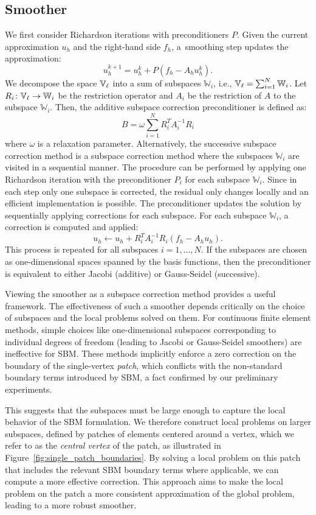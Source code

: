 \documentclass{elsarticle}
\begin{document}
\subsection{Smoother}
\label{sec:smoother}
We first consider Richardson iterations with preconditioners $P$. Given the current
approximation $u_h$ and the right-hand side $f_h$, a~smoothing step updates
the approximation:
\[
    u_h^{k+1} = u_h^k + P(f_h - A_h u_h^k).
\]
We decompose the space ${\mathbb{V}_\ell}$ into a sum of subspaces $\mathbb{W}_i$, i.e., ${\mathbb{V}_\ell} = \sum_{i=1}^N \mathbb{W}_i$. Let
$R_i\colon {\mathbb{V}_\ell} \to \mathbb{W}_i$ be the restriction operator and $A_i$ be the restriction of $A$ to the subspace
$\mathbb{W}_i$. Then, the additive subspace correction preconditioner is defined as:
\[
    B = \omega \sum_{i=1}^N R_i^T A_i^{-1} R_i
\]
where $\omega$ is a relaxation parameter. Alternatively, the successive subspace correction method is a subspace
correction method where the subspaces $\mathbb{W}_i$ are visited in a sequential manner. The procedure can be performed
by applying one Richardson iteration with the preconditioner $P_i$ for each subspace $\mathbb{W}_i$. Since in each step
only one subspace is corrected, the residual only changes locally and an efficient implementation is possible. The
preconditioner updates the solution by sequentially applying corrections for each subspace. For each subspace
$\mathbb{W}_i$, a correction is computed and applied:
\[
    u_h \leftarrow u_h + R_i^T A_i^{-1} R_i (f_h - A_h u_h).
\]
This process is repeated for all subspaces $i=1, \ldots, N$. If the subspaces are chosen as one-dimensional spaces
spanned by the basis functions, then the preconditioner is equivalent to either Jacobi (additive) or Gauss-Seidel
(successive).

Viewing the smoother as a subspace correction method provides a useful framework. The effectiveness of such a smoother
depends critically on the choice of subspaces and the local problems solved on them. For continuous finite element
methods, simple choices like one-dimensional subspaces corresponding to individual degrees of freedom (leading to
Jacobi or Gauss-Seidel smoothers) are ineffective for SBM. These methods implicitly enforce a zero correction on the
boundary of the single-vertex \emph{patch}, which conflicts with the non-standard boundary terms introduced by SBM, a
fact confirmed by our preliminary experiments.

This suggests that the subspaces must be large enough to capture the local behavior of the SBM formulation. We
therefore construct local problems on larger subspaces, defined by patches of elements centered around a vertex, which
we refer to as the \emph{central vertex} of the patch, as illustrated in Figure~\ref{fig:single_patch_boundaries}. By
solving a local problem on this patch that includes the relevant SBM boundary terms where applicable, we can compute a
more effective correction. This approach aims to make the local problem on the patch a more consistent approximation of
the global problem, leading to a more robust smoother.
\end{document}
